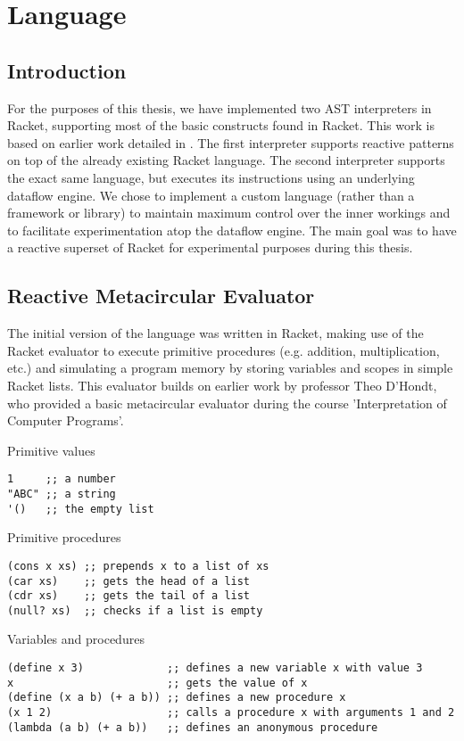 \chapter{Language}
\lstset{language=lisp,showtabs=false}

\section{Introduction}

For the purposes of this thesis, we have implemented two AST interpreters in Racket, supporting most of the basic constructs found in Racket. This work is based on earlier work detailed in \cite{abelson_structure_1999}. The first interpreter supports reactive patterns on top of the already existing Racket language. The second interpreter supports the exact same language, but executes its instructions using an underlying dataflow engine. We chose to implement a custom language (rather than a framework or library) to maintain maximum control over the inner workings and to facilitate experimentation atop the dataflow engine. The main goal was to have a reactive superset of Racket for experimental purposes during this thesis.

\section{Reactive Metacircular Evaluator}

The initial version of the language was written in Racket, making use of the Racket evaluator to execute primitive procedures (e.g. addition, multiplication, etc.) and simulating a program memory by storing variables and scopes in simple Racket lists. This evaluator builds on earlier work by professor Theo D'Hondt, who provided a basic metacircular evaluator during the course 'Interpretation of Computer Programs'. 

Primitive values
\begin{lstlisting}
1     ;; a number
"ABC" ;; a string
'()   ;; the empty list
\end{lstlisting}

Primitive procedures
\begin{lstlisting}
(cons x xs) ;; prepends x to a list of xs
(car xs)    ;; gets the head of a list
(cdr xs)    ;; gets the tail of a list
(null? xs)  ;; checks if a list is empty
\end{lstlisting}

Variables and procedures
\begin{lstlisting}
(define x 3)             ;; defines a new variable x with value 3
x                        ;; gets the value of x
(define (x a b) (+ a b)) ;; defines a new procedure x
(x 1 2)                  ;; calls a procedure x with arguments 1 and 2
(lambda (a b) (+ a b))   ;; defines an anonymous procedure
\end{lstlisting}

